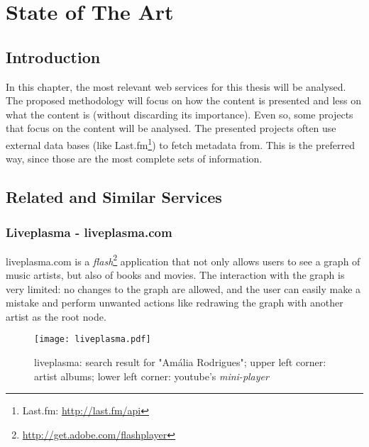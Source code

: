 
\chapter{State of The Art} \label{chap:chap2}

\section*{}


\section{Introduction}

In this chapter, the most relevant web services for this thesis will be analysed.
The proposed methodology will focus on how the content is presented and less on what the content is (without discarding its importance).
Even so, some projects that focus on the content will be analysed.
The presented projects often use external data bases (like Last.fm\footnote{Last.fm: \url{http://last.fm/api}}) to fetch metadata from.
This is the preferred way, since those are the most complete sets of information. 

\section{Related and Similar Services} %
\label{sec:related_similar_services}

  \subsection{Liveplasma - liveplasma.com} %
  \label{sub:liveplasma}

    liveplasma.com is a \emph{flash}\footnote{\url{http://get.adobe.com/flashplayer}} application that not only allows users to see a graph of music artists, but also of books and movies.
    The interaction with the graph is very limited: no changes to the graph are allowed, and the user can easily make a mistake and perform unwanted actions like redrawing the graph with another artist as the root node.

    \begin{figure}
      \begin{center}
        \texttt{[image: liveplasma.pdf]}
      \end{center}
      \caption{liveplasma: search result for "Amália Rodrigues"; upper left corner: artist albums; lower left corner: youtube's \emph{mini-player}}
      \label{fig:sota_liveplasma}
    \end{figure}

